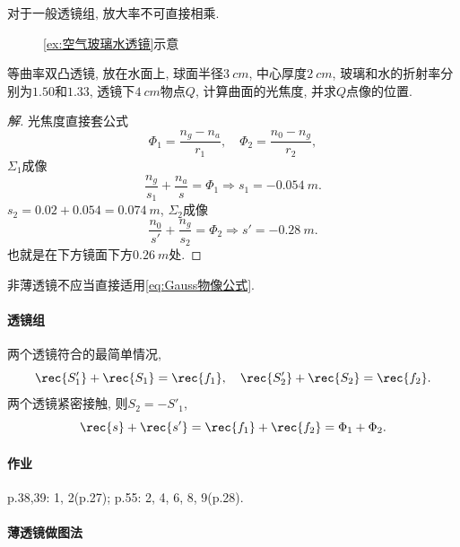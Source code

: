 \documentclass{ctexart}
\begin{document}
\begin{pitfall}
    对于一般透镜组, 放大率不可直接相乘.
\end{pitfall}
\begin{figure}[ht]
    \centering
    \caption{\cref{ex:空气玻璃水透镜}示意}
    \label{fig:空气玻璃水透镜示意}
\end{figure}
\begin{sample}
    \begin{ex}
        \label{ex:空气玻璃水透镜}
        等曲率双凸透镜, 放在水面上, 球面半径$\SI{3}{cm}$, 中心厚度$\SI{2}{cm}$, 玻璃和水的折射率分别为$1.50$和$1.33$, 透镜下$\SI{4}{cm}$物点$Q$, 计算曲面的光焦度, 并求$Q$点像的位置.
    \end{ex}
    \begin{proof}[解]
        光焦度直接套公式
        \[ \Phi_1 = \frac{n_g - n_a}{r_1},\quad \Phi_2 = \frac{n_0 - n_g}{r_2}, \]
        $\Sigma_1$成像
        \[ \frac{n_g}{s_1} + \frac{n_a}{s} = \Phi_1\Rightarrow s_1 = \SI{-0.054}{m}. \]
        $s_2 = 0.02 + 0.054 = \SI{0.074}{m}$, $\Sigma_2$成像
        \[ \frac{n_0}{s'} + \frac{n_g}{s_2} = \Phi_2\Rightarrow s' = -\SI{0.28}{m}. \]
        也就是在下方镜面下方$\SI{0.26}{m}$处.
    \end{proof}
\end{sample}
\begin{pitfall}
    非薄透镜不应当直接适用\eqref{eq:Gauss物像公式}.
\end{pitfall}

\paragraph{透镜组} %
\label{par:透镜组}

两个透镜符合的最简单情况,
\[ \rec{S'_1} + \rec{S_1} = \rec{f_1},\quad \rec{S'_2} + \rec{S_2} = \rec{f_2}. \]
两个透镜紧密接触, 则$S_2 = -S'_1$,
\[ \rec{s} + \rec{s'} = \rec{f_1} + \rec{f_2} = \Phi_1 + \Phi_2. \]


\paragraph{作业} %
\label{par:作业}

p.38,39: 1, 2(p.27); p.55: 2, 4, 6, 8, 9(p.28).


\paragraph{薄透镜做图法} %
\label{par:薄透镜做图法}
\end{document}
